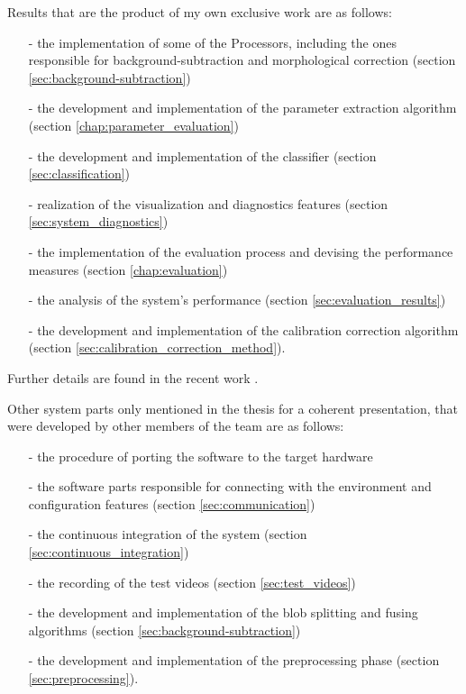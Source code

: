 \noindent Results that are the product of my own exclusive work are as follows:
\begin{itemize}
	\item[-] the implementation of some of the Processors, including the ones responsible for background-subtraction and morphological correction (section \ref{sec:background-subtraction})
	\item[-] the development and implementation of the parameter extraction algorithm (section \ref{chap:parameter_evaluation})
	\item[-] the development and implementation of the classifier (section \ref{sec:classification})
	\item[-] realization of the visualization and diagnostics features (section \ref{sec:system_diagnostics})
	\item[-] the implementation of the evaluation process and devising the performance measures (section \ref{chap:evaluation})
	\item[-] the analysis of the system's performance (section \ref{sec:evaluation_results})
	\item[-] the development and implementation of the calibration correction algorithm (section \ref{sec:calibration_correction_method}).
\end{itemize}
Further details are found in the recent work \cite{Barancsuk2016}.

\noindent Other system parts only mentioned in the thesis for a coherent presentation, that were developed by other members of the team are as follows:
\begin{itemize}
	\item[-] the procedure of porting the software to the target hardware
	\item[-] the software parts responsible for connecting with the environment and configuration features (section \ref{sec:communication})
	\item[-] the continuous integration of the system (section \ref{sec:continuous_integration})
	\item[-] the recording of the test videos (section \ref{sec:test_videos})
	\item[-] the development and implementation of the blob splitting and fusing algorithms (section \ref{sec:background-subtraction})
	\item[-] the development and implementation of the preprocessing phase (section \ref{sec:preprocessing}).
\end{itemize}

